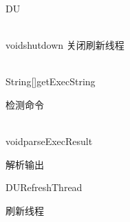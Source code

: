 \begin{XeClass}{DU}
\begin{XeMethod}{\XePublic\\ }{void}{shutdown}
 关闭刷新线程

  \end{XeMethod}

  \begin{XeMethod}{\XeProtected\\ }{String[]}{getExecString}
       
 检测命令

  \end{XeMethod}

  \begin{XeMethod}{\XeProtected\\ }{void}{parseExecResult}
       
 解析输出

  \end{XeMethod}

  \begin{XeInnerClass}{DURefreshThread}
     
 刷新线程

  \end{XeInnerClass}
\end{XeClass}
